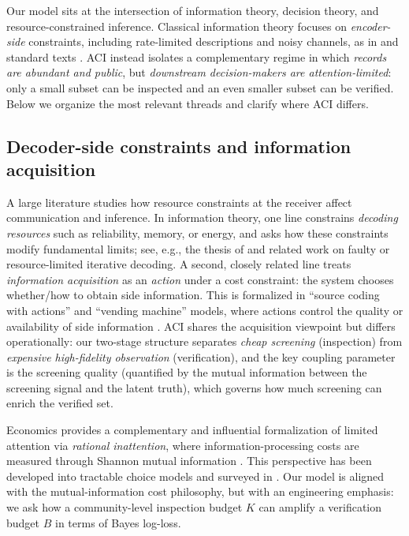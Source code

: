 \documentclass[twocolumn]{scholar7}
\begin{document}
Our model sits at the intersection of information theory, decision theory, and resource-constrained inference.
Classical information theory focuses on \emph{encoder-side} constraints, including rate-limited descriptions and noisy channels, as in \citep{shannon1948} and standard texts \citep{cover2006elements}.
ACI instead isolates a complementary regime in which \emph{records are abundant and public}, but \emph{downstream decision-makers are attention-limited}:
only a small subset can be inspected and an even smaller subset can be verified.
Below we organize the most relevant threads and clarify where ACI differs.

\subsection{Decoder-side constraints and information acquisition}

A large literature studies how resource constraints at the receiver affect communication and inference.
In information theory, one line constrains \emph{decoding resources} such as reliability, memory, or energy, and asks how these constraints modify fundamental limits; see, e.g., the thesis of \citep{varshney2010unreliable} and related work on faulty or resource-limited iterative decoding.
A second, closely related line treats \emph{information acquisition} as an \emph{action} under a cost constraint:
the system chooses whether/how to obtain side information.
This is formalized in ``source coding with actions'' and ``vending machine'' models, where actions control the quality or availability of side information \citep{permuter2011vending}.
ACI shares the acquisition viewpoint but differs operationally:
our two-stage structure separates \emph{cheap screening} (inspection) from \emph{expensive high-fidelity observation} (verification),
and the key coupling parameter is the screening quality (quantified by the mutual information between the screening signal and the latent truth), which governs how much screening can enrich the verified set.

Economics provides a complementary and influential formalization of limited attention via \emph{rational inattention},
where information-processing costs are measured through Shannon mutual information \citep{sims2003rational}.
This perspective has been developed into tractable choice models \citep{matejka2015rational,caplin2015revealed} and surveyed in \citep{mackowiak2023review}.
Our model is aligned with the mutual-information cost philosophy, but with an engineering emphasis:
we ask how a community-level inspection budget $K$ can amplify a verification budget $B$ in terms of Bayes log-loss.
\end{document}

